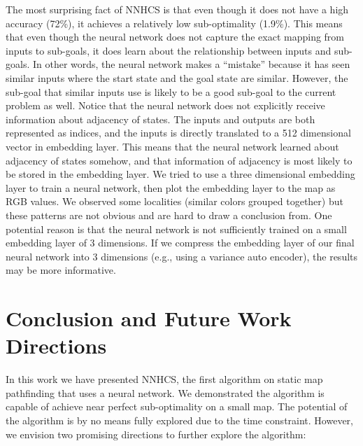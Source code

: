 \documentclass[letterpaper]{article}
\numberwithin{equation}{section}
\numberwithin{theorem}{section}
\numberwithin{lemma}{section}
\numberwithin{df}{section}
\begin{document}
    The most surprising fact of NNHCS is that even though it does not have a high accuracy (72\%), it achieves a relatively low sub-optimality (1.9\%).
    This means that even though the neural network does not capture the exact mapping from inputs to sub-goals,
    it does learn about the relationship between inputs and sub-goals.
    In other words, the neural network makes a ``mistake'' because it has seen similar inputs where the start state and the goal state are similar.
    However, the sub-goal that similar inputs use is likely to be a good sub-goal to the current problem as well.
    Notice that the neural network does not explicitly receive information about adjacency of states.
    The inputs and outputs are both represented as indices, and the inputs is directly translated to a 512 dimensional vector in embedding layer.
    This means that the neural network learned about adjacency of states somehow, and that information of adjacency is most likely to be stored in the embedding layer.
    We tried to use a three dimensional embedding layer to train a neural network, then plot the embedding layer to the map as RGB values.
    We observed some localities (similar colors grouped together) but these patterns are not obvious and are hard to draw a conclusion from.
    One potential reason is that the neural network is not sufficiently trained on a small embedding layer of 3 dimensions.
    If we compress the embedding layer of our final neural network into 3 dimensions (e.g., using a variance auto encoder), the results may be more informative.


    \section{Conclusion and Future Work Directions}\label{sec:future-work}

    In this work we have presented NNHCS, the first algorithm on static map pathfinding that uses a neural network.
    We demonstrated the algorithm is capable of achieve near perfect sub-optimality on a small map.
    The potential of the algorithm is by no means fully explored due to the time constraint.
    However, we envision two promising directions to further explore the algorithm:
\end{document}
